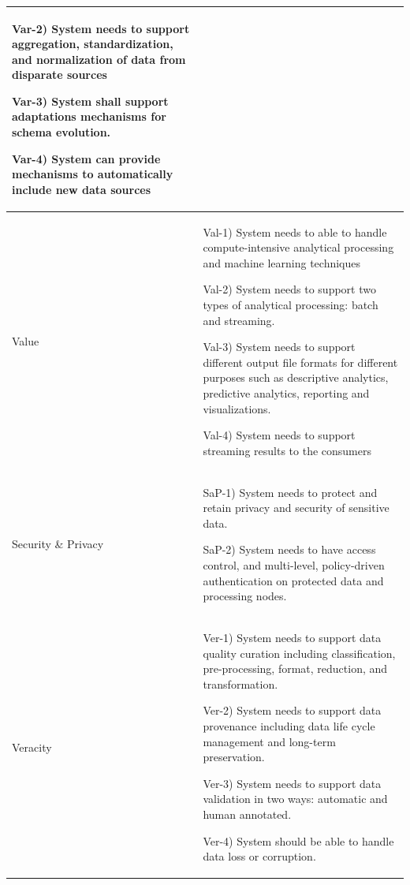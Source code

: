\documentclass[conference]{IEEEtran}
\begin{document}
\begin{center}
\begin{table}
\begin{tabular}{ | m{1.2cm} | m{14cm} |}
        Var-2) System needs to support aggregation, standardization, and normalization of data from disparate sources 

        Var-3) System shall support adaptations mechanisms for schema evolution.

        Var-4) System can provide mechanisms to automatically include new data sources 

        \\

        \hline

        Value & 
        
        Val-1) System needs to able to handle compute-intensive analytical processing and machine learning techniques 
        
        Val-2) System needs to support two types of analytical processing: batch and streaming. 

        Val-3) System needs to support different output file formats for different purposes such as descriptive analytics, predictive analytics, reporting and visualizations. 
        
        Val-4) System needs to support streaming results to the consumers 

        \\

        \hline

        Security \& Privacy & 
        
        SaP-1) System needs to protect and retain privacy and security of sensitive data.

        SaP-2) System needs to have access control, and multi-level, policy-driven authentication on protected data and processing nodes. 

        \\

        \hline
        
        Veracity &
        
        Ver-1) System needs to support data quality curation including classification, pre-processing, format, reduction, and  transformation. 
        
        Ver-2) System needs to support data provenance including data life cycle management and long-term preservation.
        
        Ver-3) System needs to support data validation in two ways: automatic and human annotated. 

        Ver-4) System should be able to handle data loss or corruption. 
        
        \\

        \hline
  
    \end{tabular}
    \end{table}
\end{center}
\end{document}
